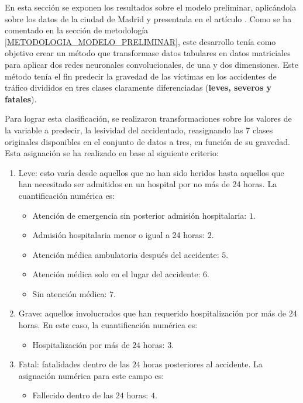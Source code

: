 

En esta sección se exponen los resultados sobre el modelo preliminar, aplicándola sobre los datos de la ciudad de Madrid y presentada en el artículo \cite{PEREZSALA2023113245}. Como se ha comentado en la sección de metodología \ref{METODOLOGIA_MODELO_PRELIMINAR}, este desarrollo tenía como objetivo crear un método que transformase datos tabulares en datos matriciales para aplicar dos redes neuronales convolucionales, de una y dos dimensiones. Este método tenía el fin predecir la gravedad de las víctimas en los accidentes de tráfico divididos en tres clases claramente diferenciadas (\textbf{leves, severos y fatales}). 

Para lograr esta clasificación, se realizaron transformaciones sobre los valores de la variable a predecir, la lesividad del accidentado, reasignando las 7 clases originales disponibles en el conjunto de datos a tres, en función de su gravedad. Esta asignación se ha realizado en base al siguiente criterio:

\begin{enumerate}
	\item Leve: esto varía desde aquellos que no han sido heridos hasta aquellos que han necesitado ser admitidos en un hospital por no más de 24 horas. La cuantificación numérica es:
	\begin{itemize}
		\item Atención de emergencia sin posterior admisión hospitalaria: $1$.
		\item Admisión hospitalaria menor o igual a 24 horas: $2$.
		\item Atención médica ambulatoria después del accidente: $5$.
		\item Atención médica solo en el lugar del accidente: $6$.
		\item Sin atención médica: $7$.
	\end{itemize}
	\item Grave: aquellos involucrados que han requerido hospitalización por más de 24 horas. En este caso, la cuantificación numérica es:
	\begin{itemize}
		\item Hospitalización por más de $24$ horas: $3$.
	\end{itemize}
	\item Fatal: fatalidades dentro de las $24$ horas posteriores al accidente. La asignación numérica para este campo es:
	\begin{itemize}
		\item Fallecido dentro de las $24$ horas: $4$.
	\end{itemize}
\end{enumerate}

